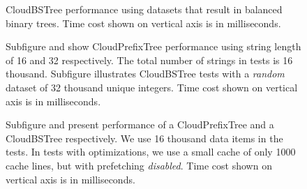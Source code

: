 \documentclass[10pt, conference, compsocconf]{IEEEtran}
\begin{document}
\begin{figure}[t]
\centering
{}
   \hspace{-1\baselineskip}
    \hspace{-1\baselineskip}
   \label{fig:bst}
 \caption[Optional caption for list of figures]{CloudBSTree performance using datasets that result in balanced binary trees.
 Time cost shown on vertical axis is in milliseconds.
 }
\label{fig:bst}
\end{figure}

\begin{figure}[t]
\centering
{}
   \hspace{-1\baselineskip}
    \hspace{-1\baselineskip}
\caption[Optional caption for list of figures]{Subfigure  and  show CloudPrefixTree performance using string length of 16 and 32 
 respectively. The total number of strings in tests is 16 thousand. Subfigure  illustrates CloudBSTree tests with a \emph{random} dataset of 32 thousand 
 unique integers. Time cost shown on vertical axis is in milliseconds.
 }
\label{fig:other1}
\end{figure}
\begin{figure}[t]
\centering
{}
   \hspace{-1\baselineskip}
\caption[Optional caption for list of figures]{Subfigure  and  present performance of 
 a CloudPrefixTree and a CloudBSTree respectively. We use 16 thousand data items in the tests.
 In tests with optimizations, we use a small cache of only 1000 cache lines, but with prefetching \emph{disabled}. 
 Time cost shown on vertical axis is in milliseconds.
 }
\label{fig:other2}
\end{figure}
\end{document}
